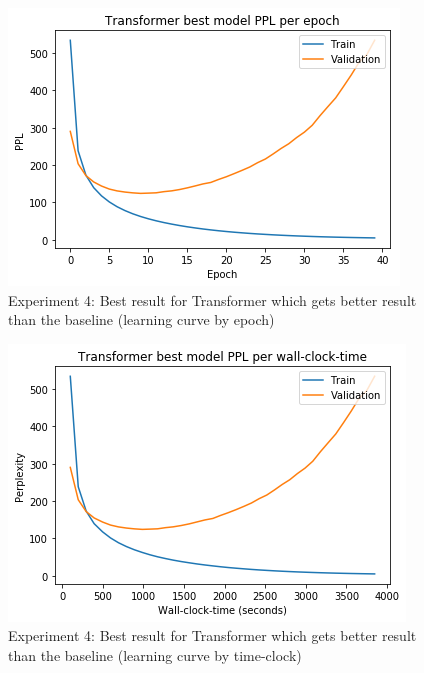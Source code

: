 \begin{itemize}
\begin{figure}[H]
	\centering
	\includegraphics[scale=0.8]{Q4-3_TR_1epoch.png}
	\caption{Experiment 4: Best result for Transformer which gets better result than the baseline (learning curve by epoch)}
	\label{fig:fig20TR}
\end{figure}
\begin{figure}[H]
	\centering
	\includegraphics[scale=0.8]{Q4-3_TR_1time.png}
	\caption{Experiment 4: Best result for Transformer which gets better result than the baseline (learning curve by time-clock)}
	\label{fig:fig20bTR}
\end{figure}


\end{itemize}
